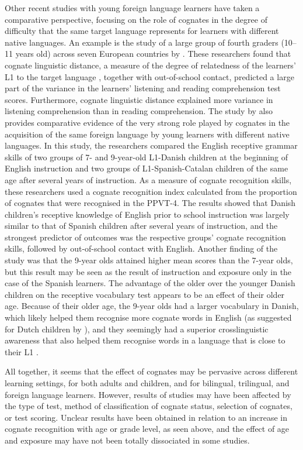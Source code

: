 \documentclass[output=paper,modfonts,nonflat,newtxmath]{langsci/langscibook}
\begin{document}
 {Other recent studies with young foreign language learners have taken a comparative perspective, focusing on the role of cognates in the degree of difficulty that the same target language represents for learners with different native languages. An example is the study of  a large group of fourth graders (10--11 years old) across seven European countries by \citet{LindgrenMuñoz2013}. These researchers found that cognate linguistic distance, a measure of the degree of relatedness of the learners’ L1 to the target language \citep{DyenEtAl1992}, together with out-of-school contact, predicted a large part of the variance in the learners’ listening and reading comprehension test scores. Furthermore, cognate linguistic distance explained more variance in listening comprehension than in reading comprehension. The study by \citet{MuñozEtAl2018} also provides comparative evidence of}{ }{the very strong role played by cognates in the acquisition of the same foreign language by young learners with different native languages}{. }{In this study, the researchers compared the English receptive grammar skills of two groups of 7- and 9-year-old L1-Danish children at the beginning of English instruction and two groups of L1-Spanish-Catalan children of the same age after several years of instruction. As a measure of cognate recognition skills, these researchers used a cognate recognition index calculated from the proportion of cognates that were recognised in the PPVT-4.}{ }{The results showed that Danish children’s receptive knowledge of English prior to school instruction was largely similar to that of Spanish children after several years of instruction, and the strongest predictor of outcomes was the respective groups’ cognate recognition skills, followed by out-of-school contact with English. Another finding of the study was that the 9-year olds attained higher mean scores than the 7-year olds, but this result may be seen as the result of instruction and exposure only in the case of the Spanish learners. The advantage of the older over the younger Danish children on the receptive vocabulary test appears to be an effect of their older age. Because of their older age, the 9-year olds had a larger vocabulary in Danish, which likely helped them recognise more cognate words in English (as suggested for Dutch children by \citealt{UnsworthEtAl2015}), and they seemingly had a superior crosslinguistic awareness that also helped them recognise words in a language that is close to their L1 \citep{Otwinowska2016}.}

 {All together, it seems that the effect of cognates may be pervasive across different learning settings, for both adults and children, and for bilingual, trilingual, and foreign language learners. However, results of studies may have been affected by the type of test, method of classification of cognate status, selection of cognates, or test scoring. Unclear results have been obtained in relation to an increase in cognate recognition with age or grade level, as seen above, and the effect of age and exposure may have not been totally dissociated in some studies.}
\end{document}
